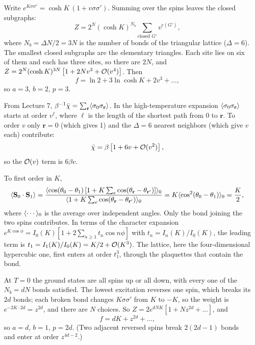 Write $e^{K\sigma\sigma'} = \cosh K\,(1+v\sigma\sigma')$. Summing over the spins leaves the closed subgraphs:
\begin{equation}
  Z = 2^N(\cosh K)^{N_b}\sum_{\text{closed }G'}v^{e(G')},
\end{equation}
where $N_b = \Delta N/2 = 3N$ is the number of bonds of the triangular lattice ($\Delta = 6$). The smallest closed
subgraphs are the elementary triangles. Each site lies on six of them and each has three sites, so there are $2N$, and
$Z = 2^N(\cosh K)^{3N}\left[1+2Nv^3+\mathcal{O}(v^4)\right]$. Then
\begin{equation}
  f = \ln 2+3\ln\cosh K+2v^3+\ldots,
\end{equation}
so $a = 3$, $b = 2$, $p = 3$.

From Lecture 7, $\beta^{-1}\bar\chi = \sum_{\mathbf r}\langle \sigma_0\sigma_{\mathbf r}\rangle$. In the high-temperature
expansion $\langle \sigma_0\sigma_{\mathbf r}\rangle$ starts at order $v^{\ell}$, where $\ell$ is the length of the shortest path
from 0 to $\mathbf r$. To order $v$ only $\mathbf r = 0$ (which gives 1) and the $\Delta = 6$ nearest neighbors (which
give $v$ each) contribute:
\begin{equation}
  \bar\chi = \beta\left[1+6v+\mathcal{O}(v^2)\right],
\end{equation}
so the $\mathcal{O}(v)$ term is $6\beta v$.

To first order in $K$,
\begin{equation}
  \langle \mathbf S_0\cdot\mathbf S_1\rangle = \frac{\langle \cos(\theta_0-\theta_1)\left[1+K\sum_{e}\cos(\theta_{\mathbf r}-\theta_{\mathbf r'})\right]\rangle_0}
  {\langle 1+K\sum_{e}\cos(\theta_{\mathbf r}-\theta_{\mathbf r'})\rangle_0}
  = K\langle \cos^2(\theta_0-\theta_1)\rangle_0 = \frac{K}{2},
\end{equation}
where $\langle \cdots\rangle_0$ is the average over independent angles. Only the bond joining the two spins contributes. In terms
of the character expansion $e^{K\cos\phi} = I_0(K)\left[1+2\sum_{n\ge1}t_n\cos n\phi\right]$ with
$t_n = I_n(K)/I_0(K)$, the leading term is $t_1 = I_1(K)/I_0(K) = K/2+\mathcal{O}(K^3)$. The lattice, here the
four-dimensional hypercubic one, first enters at order $t_1^3$, through the plaquettes that contain the bond.

At $T = 0$ the ground states are all spins up or all down, with every one of the $N_b = dN$ bonds satisfied. The
lowest excitation reverses one spin, which breaks its $2d$ bonds; each broken bond changes $K\sigma\sigma'$ from $K$ to
$-K$, so the weight is $e^{-2K\cdot 2d} = z^{2d}$, and there are $N$ choices. So
$Z = 2e^{dNK}\left[1+Nz^{2d}+\ldots\right]$, and
\begin{equation}
  f = dK+z^{2d}+\ldots ,
\end{equation}
so $a = d$, $b = 1$, $p = 2d$. (Two adjacent reversed spins break $2(2d-1)$ bonds and enter at order $z^{4d-2}$.)

